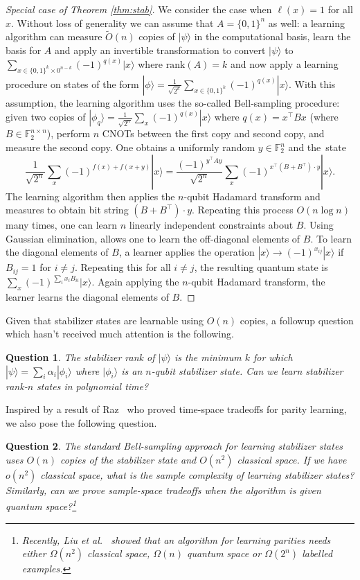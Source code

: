 \documentclass[11pt]{article}
\def\01{\{0,1\}}
\def\01{\{0,1\}}
\newcommand{\ket}[1]{|#1\rangle}
\newcommand{\rank}{\mathrm{rank}}
\newcommand{\FF}{\mathbb{F}}
\newtheorem{question}{Question}
\begin{document}
\begin{proof}[Special case of Theorem \ref{thm:stab}]
We consider the case when $\ell(x)=1$ for all $x$. Without loss of generality we can assume that $A=\01^n$ as well: a learning algorithm can measure $\tilde{O}(n)$ copies of $\ket{\psi}$ in the computational basis, learn the basis for $A$ and apply an  invertible transformation  to convert $\ket{\psi}$ to $\sum_{x\in \01^{k}\times 0^{n-k}}(-1)^{q(x)}\ket{x}$ where $\rank(A)=k$  and now apply a learning procedure on states of the form $\ket{\phi}=\frac{1}{\sqrt{2^k}}\sum_{x\in \01^k} (-1)^{q(x)}\ket{x}$. With this assumption, the learning algorithm uses the so-called Bell-sampling procedure: given two copies of $\ket{\phi_q}=\frac{1}{\sqrt{2^n}}\sum_{x} (-1)^{q(x)}\ket{x}$ where $q(x)=x^\top B x$ (where $B\in \FF_2^{n\times n}$), perform $n$ CNOTs between the first copy and  second copy, and measure the second copy. One obtains a uniformly random $y\in \FF_2^n$ and the~state 
$$
\frac{1}{\sqrt{2^n}}\sum_x (-1)^{f(x)+f(x+y)}\ket{x}=\frac{(-1)^{y^\top Ay}}{\sqrt{2^n}}\sum_x (-1)^{x^\top(B+B^\top)\cdot y}\ket{x}.
$$
The learning algorithm then applies the $n$-qubit Hadamard transform and measures to obtain bit string $(B+B^\top)\cdot y$. Repeating this process $O(n\log n)$ many times, one can learn $n$ linearly independent constraints about $B$. Using Gaussian elimination, allows one to learn the off-diagonal elements of $B$. {To learn the diagonal elements of $B$, a learner applies the operation $\ket{x}\rightarrow (-1)^{x_{ij}}\ket{x}$ if $B_{ij}=1$ for $i\neq j$. Repeating this for all $i\neq j$, the resulting quantum state is $\sum_x (-1)^{\sum_i x_i B_{ii}}\ket{x}$. Again applying the $n$-qubit Hadamard transform, the learner learns the diagonal elements of $B$.}  
\end{proof}

Given that stabilizer states are learnable using $O(n)$ copies, a followup question which hasn't received much attention is the following.

\begin{question}
    The stabilizer rank of $\ket{\psi}$ is the minimum $k$ for which $\ket{\psi}=\sum_i \alpha_i \ket{\phi_i}$ where $\ket{\phi_i}$ is an $n$-qubit stabilizer state. Can we learn stabilizer rank-$n$ states in polynomial time? 
\end{question}

Inspired by a result of Raz~\cite{DBLP:journals/jacm/Raz19} who proved time-space tradeoffs for parity learning, we also pose the following question.
\begin{question}
    The standard Bell-sampling approach for learning stabilizer states uses $O(n)$ copies of the stabilizer state and $O(n^2)$ classical space. If we have $o(n^2)$ classical space, what is the sample complexity of learning stabilizer states? Similarly, can we prove sample-space tradeoffs when the algorithm is given quantum space?\footnote{Recently, Liu et al.~\cite{liumemory} showed that an algorithm for learning parities needs either $\Omega(n^2)$ classical space, $\Omega(n)$ quantum space or $\Omega(2^n)$ labelled examples.}
\end{question}
    
\end{document}
